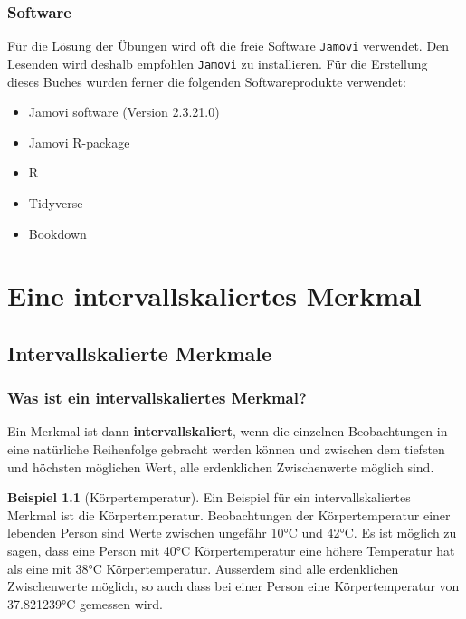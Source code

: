 \documentclass[
]{book}
\providecommand{\tightlist}{%
  \setlength{\itemsep}{0pt}\setlength{\parskip}{0pt}}
\theoremstyle{definition}
\theoremstyle{definition}
\newtheorem{example}{Beispiel}[chapter]
\theoremstyle{definition}
\theoremstyle{definition}
\theoremstyle{remark}
\begin{document}
\section{Software}\label{software}

Für die Lösung der Übungen wird oft die freie Software \texttt{Jamovi} verwendet. Den Lesenden wird deshalb empfohlen \texttt{Jamovi} zu installieren. Für die Erstellung dieses Buches wurden ferner die folgenden Softwareprodukte verwendet:

\begin{itemize}
\tightlist
\item
  Jamovi software (Version 2.3.21.0)
\item
  Jamovi R-package \citep{R-jmv}
\item
  R \citep{R-base}
\item
  Tidyverse \citep{tidyverse2019}
\item
  Bookdown \citep{bookdown2016}
\end{itemize}

\part{Eine intervallskaliertes Merkmal}\label{part-eine-intervallskaliertes-merkmal}

\chapter{Intervallskalierte Merkmale}\label{intervallskalierte-merkmale}

\section{Was ist ein intervallskaliertes Merkmal?}\label{intervallskalierte-merkmale-definition}

\label{customdef-intervallskaliert}{Ein Merkmal ist dann \textbf{intervallskaliert}, wenn die einzelnen Beobachtungen in eine natürliche Reihenfolge gebracht werden können und zwischen dem tiefsten und höchsten möglichen Wert, alle erdenklichen Zwischenwerte möglich sind.}

\begin{example}[Körpertemperatur]
\protect\hypertarget{exm:humtemp}{}\label{exm:humtemp}Ein Beispiel für ein intervallskaliertes Merkmal ist die Körpertemperatur. Beobachtungen der Körpertemperatur einer lebenden Person sind Werte zwischen ungefähr 10°C und 42°C. Es ist möglich zu sagen, dass eine Person mit 40°C Körpertemperatur eine höhere Temperatur hat als eine mit 38°C Körpertemperatur. Ausserdem sind alle erdenklichen Zwischenwerte möglich, so auch dass bei einer Person eine Körpertemperatur von 37.821239°C gemessen wird.
\end{example}
\end{document}
